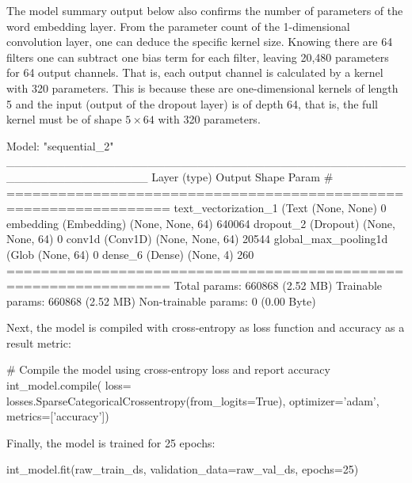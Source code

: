 The model summary output below also confirms the number of parameters of the word embedding layer. From the parameter count of the 1-dimensional convolution layer, one can deduce the specific kernel size. Knowing there are 64 filters one can subtract one bias term for each filter, leaving 20,480 parameters for 64 output channels. That is, each output channel is calculated by a kernel with 320 parameters. This is because these are one-dimensional kernels of length 5 and the input (output of the dropout layer) is of depth 64, that is, the full kernel must be of shape $5 \times 64$ with 320 parameters. 

\begin{samepage}
\begin{textcode}
Model: "sequential_2"
_________________________________________________________________
 Layer (type)                Output Shape              Param #   
=================================================================
 text_vectorization_1 (Text  (None, None)              0         
 embedding (Embedding)       (None, None, 64)          640064    
 dropout_2 (Dropout)         (None, None, 64)          0         
 conv1d (Conv1D)             (None, None, 64)          20544     
 global_max_pooling1d (Glob  (None, 64)                0         
 dense_6 (Dense)             (None, 4)                 260       
=================================================================
Total params: 660868 (2.52 MB)
Trainable params: 660868 (2.52 MB)
Non-trainable params: 0 (0.00 Byte)
\end{textcode}
\end{samepage}

Next, the model is compiled with cross-entropy as loss function and accuracy as a result metric:

\begin{samepage}
\begin{pythoncode}
# Compile the model using cross-entropy loss and report accuracy
int_model.compile(
    loss= losses.SparseCategoricalCrossentropy(from_logits=True),
    optimizer='adam',
    metrics=['accuracy'])
\end{pythoncode}
\end{samepage}

Finally, the model is trained for 25 epochs: 

\begin{samepage}
\begin{pythoncode}
int_model.fit(raw_train_ds, 
              validation_data=raw_val_ds, 
              epochs=25)
\end{pythoncode}
\end{samepage}

